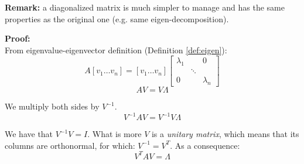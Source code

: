 \textbf{Remark:} a diagonalized matrix is much simpler to manage and has the same properties as the original one (e.g. same eigen-decomposition).

\vspace{5mm}

\textbf{Proof:}\\
From eigenvalue-eigenvector definition (Definition \ref{def:eigen}):
\begin{equation*}
    A[v_1 \hdots v_n] = [v_1 \hdots v_n]
  \begin{bmatrix}
    \lambda_{1} & & 0\\
    & \ddots & \\
    0 & & \lambda_{n}
  \end{bmatrix}
\end{equation*}
\begin{equation*}
    AV = V \Lambda
\end{equation*}

We multiply both sides by $V^{-1}$.
\begin{equation*}
    V^{-1}AV = V^{-1}V \Lambda
\end{equation*}

We have that $V^{-1}V = I$. What is more $V$ is a \textit{unitary matrix}, which means that its columns are orthonormal, for which: $V^{-1} = V^T$. As a consequence:
\begin{equation*}
    V^{T}AV = \Lambda
\end{equation*}



